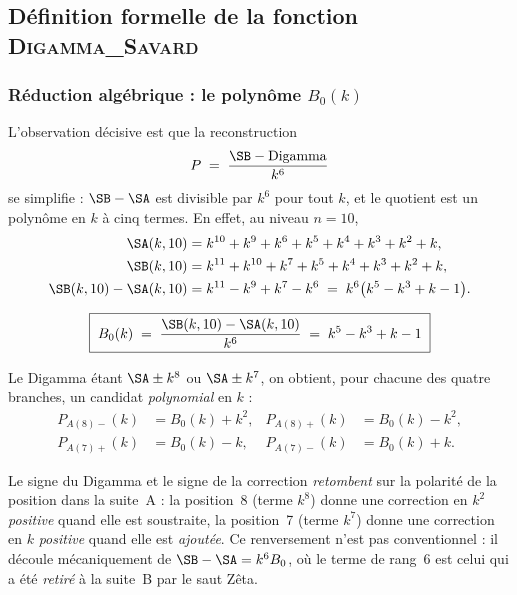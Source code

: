 \subsection{Définition formelle de la fonction \textsc{Digamma\_Savard}}

\subsubsection{Réduction algébrique : le polynôme $B_0(k)$}

L'observation décisive est que la reconstruction
\[
  P \;=\; \frac{\SB - \mathrm{Digamma}}{k^{6}}
\]
se simplifie : $\SB - \SA$ est divisible par $k^{6}$ pour tout $k$, et le
quotient est un polynôme en $k$ à cinq termes. En effet, au niveau
$n = 10$,
\begin{align*}
  \SA(k,10) &= k^{10}+k^{9}+k^{6}+k^{5}+k^{4}+k^{3}+k^{2}+k,\\
  \SB(k,10) &= k^{11}+k^{10}+k^{7}+k^{5}+k^{4}+k^{3}+k^{2}+k,\\
  \SB(k,10)-\SA(k,10) &= k^{11}-k^{9}+k^{7}-k^{6}
  \;=\; k^{6}\bigl(k^{5}-k^{3}+k-1\bigr).
\end{align*}

\begin{boiteformule}
\[
  \boxed{\;B_0(k) \;=\; \frac{\SB(k,10)-\SA(k,10)}{k^{6}}
  \;=\; k^{5}-k^{3}+k-1\;}
\]
\end{boiteformule}

Le Digamma étant $\SA \pm k^{8}$ ou $\SA \pm k^{7}$, on obtient, pour
chacune des quatre branches, un candidat \emph{polynomial} en $k$ :
\begin{align*}
  P_{A(8)-}(k) &= B_0(k) + k^{2}, &
  P_{A(8)+}(k) &= B_0(k) - k^{2},\\
  P_{A(7)+}(k) &= B_0(k) - k, &
  P_{A(7)-}(k) &= B_0(k) + k.
\end{align*}

\begin{boitenote}
Le signe du Digamma et le signe de la correction \emph{retombent} sur la
polarité de la position dans la suite~A : la position~8 (terme
$k^{8}$) donne une correction en $k^{2}$ \emph{positive} quand elle est
soustraite, la position~7 (terme $k^{7}$) donne une correction en $k$
\emph{positive} quand elle est \emph{ajoutée}. Ce renversement n'est pas
conventionnel : il découle mécaniquement de
$\SB-\SA = k^{6}B_0$, où le terme de rang~6 est celui qui a été
\emph{retiré} à la suite~B par le saut Zêta.
\end{boitenote}

